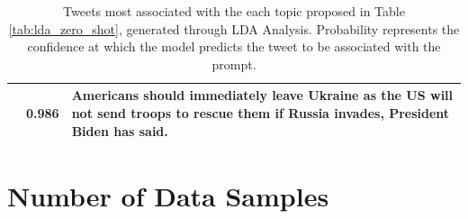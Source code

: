 \begin{table}[htbp]
{\begin{tabular}{llp{18cm}}
                                      & \multirow{2}{*}{0.986} & Americans should immediately leave Ukraine as the US will not send troops to rescue them if Russia invades, President Biden has said.                                                                                                                                                   \\
            \bottomrule
        \end{tabular}%
    }
    \caption{Tweets most associated with the each topic proposed in Table \ref{tab:lda_zero_shot}, generated through LDA Analysis. Probability represents the confidence at which the model predicts the tweet to be associated with the prompt.}
    \label{tab:lda_topic_tweets}
\end{table}

\chapter{Number of Data Samples}
\label{app:number_data_samples}

